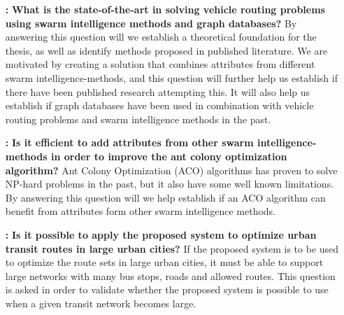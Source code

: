 \begin{itemize}

    \item[\textbf{\namedlabel{itm:RQ1}{RQ 1}:}] \textbf{What is the state-of-the-art in solving vehicle routing problems using swarm intelligence methods and graph databases?}
    \newline
    By answering this question will we establish a theoretical foundation for the thesis, as well as identify methods proposed in published literature. We are motivated by creating a solution that combines attributes from different swarm intelligence-methods, and this question will further help us establish if there have been published research attempting this. It will also help us establish if graph databases have been used in combination with vehicle routing problems and swarm intelligence methods in the past. 


    \item[\textbf{\namedlabel{itm:RQ2}{RQ 2}:}]\label{itm:RQ2} \textbf{Is it efficient to add attributes from other swarm intelligence-methods in order to improve the ant colony optimization algorithm?}
    \newline
    Ant Colony Optimization (ACO) algorithms has proven to solve NP-hard problems in the past, but it also have some well known limitations. By answering this question will we help establish if an ACO algorithm can benefit from attributes form other swarm intelligence methods.  

    \item[\textbf{\namedlabel{itm:RQ3}{RQ 3}:}]\label{itm:RQ3}\textbf{Is it possible to apply the proposed system to optimize urban transit routes in large urban cities?}
    \newline
    If the proposed system is to be used to optimize the route sets in large urban cities, it must be able to support large networks with many bus stops, roads and allowed routes. This question is asked in order to validate whether the proposed system is possible to use when a given transit network becomes large. 
\end{itemize}



